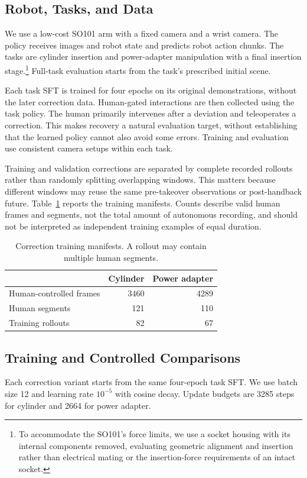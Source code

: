 \documentclass[letterpaper,10pt,conference]{ieeeconf}
\begin{document}
\subsection{Robot, Tasks, and Data}
We use a low-cost SO101 arm with a fixed camera and a wrist camera. The policy receives images and robot state and predicts robot action chunks. The tasks are cylinder insertion and power-adapter manipulation with a final insertion stage.\footnote{To accommodate the SO101's force limits, we use a socket housing with its internal components removed, evaluating geometric alignment and insertion rather than electrical mating or the insertion-force requirements of an intact socket.} Full-task evaluation starts from the task's prescribed initial scene.

Each task SFT is trained for four epochs on its original demonstrations, without the later correction data. Human-gated interactions are then collected using the task policy. The human primarily intervenes after a deviation and teleoperates a correction. This makes recovery a natural evaluation target, without establishing that the learned policy cannot also avoid some errors. Training and evaluation use consistent camera setups within each task.

Training and validation corrections are separated by complete recorded rollouts rather than randomly splitting overlapping windows. This matters because different windows may reuse the same pre-takeover observations or post-handback future. Table~\ref{tab:data} reports the training manifests. Counts describe valid human frames and segments, not the total amount of autonomous recording, and should not be interpreted as independent training examples of equal duration.

\begin{table}[t]
\centering\small
\caption{Correction training manifests. A rollout may contain multiple human segments.}
\label{tab:data}
\begin{tabularx}{\columnwidth}{@{}Xrr@{}}
\toprule
 & Cylinder & Power adapter \\
\midrule
Human-controlled frames & 3460 & 4289 \\
Human segments & 121 & 110 \\
Training rollouts & 82 & 67 \\
\bottomrule
\end{tabularx}
\end{table}

\subsection{Training and Controlled Comparisons}
Each correction variant starts from the same four-epoch task SFT. We use batch size 12 and learning rate $10^{-5}$ with cosine decay. Update budgets are 3285 steps for cylinder and 2664 for power adapter.
\end{document}
